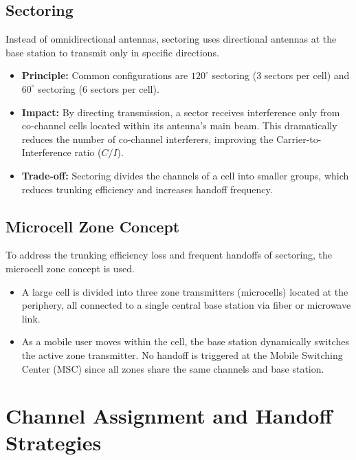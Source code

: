 \documentclass[12pt,a4paper]{article}
\begin{document}
\subsection{Sectoring}
Instead of omnidirectional antennas, sectoring uses directional antennas at the base station to transmit only in specific directions.
\begin{itemize}[leftmargin=*, itemsep=3.5pt]
  \item \textbf{Principle:} Common configurations are $120^\circ$ sectoring (3 sectors per cell) and $60^\circ$ sectoring (6 sectors per cell).
  \item \textbf{Impact:} By directing transmission, a sector receives interference only from co-channel cells located within its antenna's main beam. This dramatically reduces the number of co-channel interferers, improving the Carrier-to-Interference ratio ($C/I$).
  \item \textbf{Trade-off:} Sectoring divides the channels of a cell into smaller groups, which reduces trunking efficiency and increases handoff frequency.
\end{itemize}

\subsection{Microcell Zone Concept}
To address the trunking efficiency loss and frequent handoffs of sectoring, the microcell zone concept is used.
\begin{itemize}[leftmargin=*, itemsep=3.5pt]
  \item A large cell is divided into three zone transmitters (microcells) located at the periphery, all connected to a single central base station via fiber or microwave link.
  \item As a mobile user moves within the cell, the base station dynamically switches the active zone transmitter. No handoff is triggered at the Mobile Switching Center (MSC) since all zones share the same channels and base station.
\end{itemize}

\section{Channel Assignment and Handoff Strategies}
\end{document}
